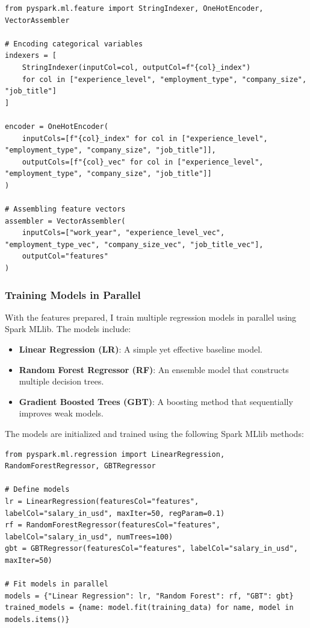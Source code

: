 \documentclass[12pt,a4paper]{article}
\begin{document}
\begin{multicols}{2}
\begin{lstlisting}
from pyspark.ml.feature import StringIndexer, OneHotEncoder, VectorAssembler

# Encoding categorical variables
indexers = [
    StringIndexer(inputCol=col, outputCol=f"{col}_index")
    for col in ["experience_level", "employment_type", "company_size", "job_title"]
]

encoder = OneHotEncoder(
    inputCols=[f"{col}_index" for col in ["experience_level", "employment_type", "company_size", "job_title"]],
    outputCols=[f"{col}_vec" for col in ["experience_level", "employment_type", "company_size", "job_title"]]
)

# Assembling feature vectors
assembler = VectorAssembler(
    inputCols=["work_year", "experience_level_vec", "employment_type_vec", "company_size_vec", "job_title_vec"],
    outputCol="features"
)
\end{lstlisting}

\subsubsection{Training Models in Parallel}
With the features prepared, I train multiple regression models in parallel using Spark MLlib. The models include:

\begin{itemize}
    \item \textbf{Linear Regression (LR)}: A simple yet effective baseline model.
    \item \textbf{Random Forest Regressor (RF)}: An ensemble model that constructs multiple decision trees.
    \item \textbf{Gradient Boosted Trees (GBT)}: A boosting method that sequentially improves weak models.
\end{itemize}

The models are initialized and trained using the following Spark MLlib methods:

\begin{lstlisting}
from pyspark.ml.regression import LinearRegression, RandomForestRegressor, GBTRegressor

# Define models
lr = LinearRegression(featuresCol="features", labelCol="salary_in_usd", maxIter=50, regParam=0.1)
rf = RandomForestRegressor(featuresCol="features", labelCol="salary_in_usd", numTrees=100)
gbt = GBTRegressor(featuresCol="features", labelCol="salary_in_usd", maxIter=50)

# Fit models in parallel
models = {"Linear Regression": lr, "Random Forest": rf, "GBT": gbt}
trained_models = {name: model.fit(training_data) for name, model in models.items()}
\end{lstlisting}



\end{multicols}
\end{document}

